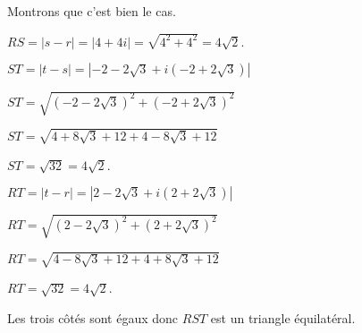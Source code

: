 \begin{corrige}
\begin{enumerate}
\begin{enumerate}[label=\alph*.]
               Montrons que c'est bien le cas.
               \par
               $RS=|s-r|=|4+4i|=\sqrt{4^2+4^2}=4\sqrt{2}$.
               \par
               $ST=|t-s|=\left|-2-2\sqrt{3}+i\left(-2+2\sqrt{3}\right)\right|$
               \par
               $ST=\sqrt{\left(-2-2\sqrt{3}\right)^2+\left(-2+2\sqrt{3}\right)^2}$
               \par
               $ST=\sqrt{4+8\sqrt{3}+12+4-8\sqrt{3}+12}$
               \par
               $ST=\sqrt{32}=4\sqrt{2}$.
               \par
               $RT=|t-r| = \left| 2-2\sqrt{3}+i\left(2+2\sqrt{3}\right)\right|$
               \par
               $RT=\sqrt{\left(2-2\sqrt{3}\right)^2+\left(2+2\sqrt{3}\right)^2}$
               \par
               $RT=\sqrt{4-8\sqrt{3}+12+4+8\sqrt{3}+12}$
               \par
               $RT=\sqrt{32}=4\sqrt{2}$.
               \par
               Les trois côtés sont égaux donc $RST$ est un triangle équilatéral.
          \end{enumerate}
     \end{enumerate}
\end{corrige}
